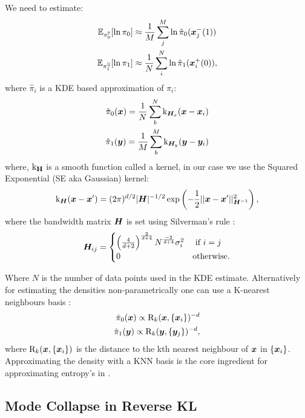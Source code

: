\documentclass[a4paper,12pt,twoside,openright]{report}
\theoremstyle{definition}
\begin{document}
We need to estimate:
\begin{align*}
\mathbb{E}_{\pi_0^{\mathbb{P}}}[\ln\pi_{0}] &\approx \frac{1}{M}\sum_{j}^{M} \ln \hat{\pi}_0({\bm{x}}_j^{-}(1)) \\
\mathbb{E}_{\pi_1^{\mathbb{Q}}}[\ln\pi_{1}] &\approx \frac{1}{N}\sum_{i}^{N} \ln \hat{\pi}_1({\bm{x}}_i^{+}(0)),
\end{align*}
where $\hat{\pi}_i$ is a KDE based approximation of $\pi_i$:
\begin{align*}
\hat{\pi}_0({\bm{x}}) = \frac{1}{N} \sum_b^{N} {\text{k}}_{{\bm{H}}_x}({\bm{x}} - {\bm{x}}_i) \\
\hat{\pi}_1({\bm{y}}) = \frac{1}{M} \sum_b^{M} {\text{k}}_{{\bm{H}}_y}({\bm{y}} - {\bm{y}}_i)
\end{align*}
where, ${\text{k}}_{\textbf{H}}$ is a smooth function called a kernel, in our case we use the Squared Exponential (SE aka Gaussian) kernel:
\begin{align*}
{\text{k}}_{{\bm{H}}}({\bm{x}}-{\bm{x}}') = (2\pi)^{d/2}|{\bm{H}}|^{-1/2}\exp\left(-\frac{1}{2}||{\bm{x}}-{\bm{x}}'||^{2}_{{\bm{H}}^{-1}}\right),
\end{align*}
where the bandwidth matrix ${\bm{H}}$ is set using Silverman's rule \citep{silverman1986density}:
\begin{align}
{\bm{H}}_{ij} = \begin{cases}
\left(\frac{4}{d+2}\right)^{\frac{2}{d+4}} N^{\frac{-2}{d+4}} \sigma_{i}^2  &\text{  if  } i=j \\
0  &\text{otherwise}.
\end{cases}
\end{align}

Where $N$ is the number of data points used in the KDE estimate. Alternatively for estimating the densities non-parametrically one can use a K-nearest neighbours basis \citep{veksler2013nonparametric}:
\begin{align*}
\hat{\pi}_0({\bm{x}}) \propto  \text{R}_k({\bm{x}}, \{{\bm{x}}_i\})^{-d}\\
\hat{\pi}_1({\bm{y}}) \propto \text{R}_k({\bm{y}}, \{{\bm{y}}_j\})^{-d},
\end{align*}
where $\text{R}_k({\bm{x}}, \{{\bm{x}}_i\})$ is the distance to the kth nearest neighbour of ${\bm{x}}$ in $\{{\bm{x}}_i\}$.  Approximating the density with a KNN basis is the core ingredient for approximating entropy's in \cite{singh2016analysis}.

\subsection{Mode Collapse in Reverse KL}
\end{document}
